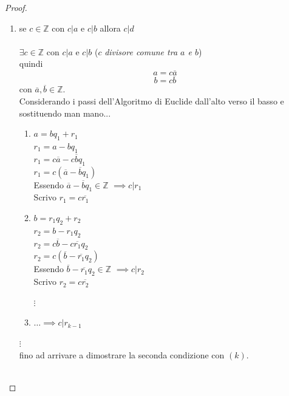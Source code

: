 \documentclass[a4paper,12pt, oneside]{book}
\begin{document}
\begin{proof}
\begin{itemize}
\begin{enumerate}
			      \item se $c \in \mathbb{Z}$ con $c|a$ e $c|b$ allora $c|d$\\\\
			            $\exists c \in \mathbb{Z}$ con $c|a$ e $c|b$ ($c$ \textit{divisore comune tra $a$ e $b$})\\
			            quindi $$a = c \overline{a}$$ $$b = c \overline{b}$$
			            con $\overline{a}, \overline{b} \in \mathbb{Z}$.\\
			            Considerando i passi dell'Algoritmo di Euclide dall'alto verso il basso e sostituendo man mano...
			            \begin{enumerate}[label=(\arabic*)]
				            \item $a = bq_1 + r_1$\\
				                  $r_{1} = a-bq_1$\\
				                  $r_{1} = c\overline{a}-c\overline{b}q_1$\\
				                  $r_{1} = c(\overline{a}-\overline{b}q_1)$\\
				                  Essendo $\overline{a}-\overline{b}q_1 \in \mathbb{Z}$ $\implies c|r_1$\\

				                  Scrivo $r_1 = c\overline{r_1}$
				            \item $b = r_1q_2 + r_2$\\
				                  $r_2 = b-r_1q_2$\\
				                  $r_2 = c\overline{b}-c\overline{r_1}q_2$\\
				                  $r_2 = c(\overline{b}-\overline{r_1}q_2)$\\
				                  Essendo $\overline{b}-\overline{r_1}q_2 \in \mathbb{Z}$ $\implies c|r_2$\\

				                  Scrivo $r_2 = c\overline{r_2}$

				                  $\vdots$

				            \item $\dots \implies c|r_{k-1}$
			            \end{enumerate}
			            $\vdots$\\
			            fino ad arrivare a dimostrare la seconda condizione con $(k)$.\\\\


\end{enumerate}
\end{itemize}
\end{proof}
\end{document}
